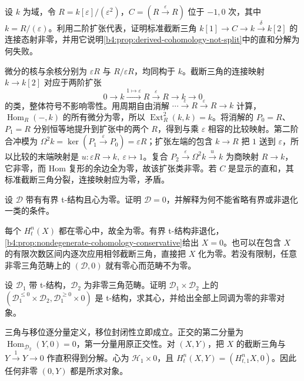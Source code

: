 \begin{exercise}\label{b4:ex:19-two-cohomology-not-split}
	设 \(k\) 为域，令 \(R=k[\varepsilon]/(\varepsilon^2)\)，\(C=(R\xrightarrow{\varepsilon}R)\) 位于 \(-1,0\) 次，其中 \(k=R/(\varepsilon)\)。利用二阶扩张代表，证明标准截断三角 \(k[1]\to C\to k\xrightarrow{\delta}k[2]\) 的连接态射非零，并用它说明\cref{b4:prop:derived-cohomology-not-split}中的直和分解为何失败。
\end{exercise}
\begin{solution}
	微分的核与余核分别为 \(\varepsilon R\) 与 \(R/\varepsilon R\)，均同构于 \(k\)。截断三角的连接映射 \(k\to k[2]\) 对应于两阶扩张
	\[
		0\longrightarrow k\xrightarrow{1\mapsto\varepsilon}R \xrightarrow{\varepsilon}R\longrightarrow k\longrightarrow0
	\]
	的类，整体符号不影响零性。用周期自由消解 \(\cdots\xrightarrow{\varepsilon}R\xrightarrow{\varepsilon}R\to k\) 计算，\(\operatorname{Hom}_R(-,k)\) 的所有微分为零，所以 \(\operatorname{Ext}_R^2(k,k)=k\)。将消解的 \(P_0=R\)、\(P_1=R\) 分别恒等地提升到扩张中的两个 \(R\)，得到与乘 \(\varepsilon\) 相容的比较映射。第二阶合冲模为 \(\Omega^2k=\ker(P_1\xrightarrow{\varepsilon}P_0)=\varepsilon R\)；扩张左端的包含 \(k\to R\) 把 \(1\) 送到 \(\varepsilon\)，所以比较的末端映射是 \(u:\varepsilon R\to k,\ \varepsilon\mapsto1\)。复合 \(P_2\xrightarrow{\varepsilon}\Omega^2k\xrightarrow{u}k\) 为商映射 \(R\to k\)，它非零，而 Hom 复形的余边全为零，故该扩张类非零。若 \(C\) 是显示的直和，其标准截断三角分裂，连接映射应为零，矛盾。
\end{solution}

\begin{exercise}\label{b4:ex:19-bounded-heart-zero}
	设 \(\mathcal D\) 带有有界 t-结构且心为零。证明 \(\mathcal D=0\)，并解释为何不能省略有界或非退化一类的条件。
\end{exercise}
\begin{solution}
	每个 \(H_t^n(X)\) 都在零心中，故全为零。有界 t-结构非退化，\cref{b4:prop:nondegenerate-cohomology-conservative}给出 \(X=0\)。也可以在包含 \(X\) 的有限次数区间内逐次应用相邻截断三角，直接把 \(X\) 化为零。若没有限制，任意非零三角范畴上的 \((\mathcal D,0)\) 就有零心而范畴不为零。
\end{solution}

\begin{exercise}\label{b4:ex:19-product-degenerate}
	设 \(\mathcal D_1\) 带 t-结构，\(\mathcal D_2\) 为非零三角范畴。证明 \(\mathcal D_1\times\mathcal D_2\) 上的 \((\mathcal D_1^{\le0}\times\mathcal D_2,\mathcal D_1^{\ge0}\times0)\) 是 t-结构，求其心，并给出全部上同调为零的非零对象。
\end{exercise}
\begin{solution}
	三角与移位逐分量定义，移位封闭性立即成立。正交的第二分量为 \(\operatorname{Hom}_{\mathcal D_2}(Y,0)=0\)，第一分量用原正交性。对 \((X,Y)\)，把 \(X\) 的截断三角与 \(Y\xrightarrow{1}Y\to0\) 作直积得到分解。心为 \(\mathcal H_1\times0\)，且 \(H_t^n(X,Y)=(H_{t,1}^nX,0)\)。因此任何非零 \((0,Y)\) 都是所求对象。
\end{solution}

